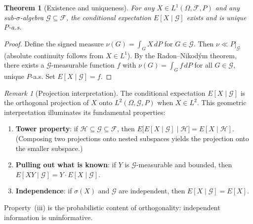 \documentclass[12pt]{amsart}
\newtheorem{theorem}{Theorem}[section]
\theoremstyle{definition}
\theoremstyle{remark}
\newtheorem*{remark}{Remark}
\newcommand{\cF}{\mathcal{F}}
\begin{document}
\begin{theorem}[Existence and uniqueness]\label{thm:cond-exp-exists}
For any $X \in L^1(\Omega, \cF, P)$ and any sub-$\sigma$-algebra $\mathcal{G} \subseteq \cF$, the conditional expectation $E[X \mid \mathcal{G}]$ exists and is unique $P$-a.s.
\end{theorem}

\begin{proof}
Define the signed measure $\nu(G) = \int_G X\, dP$ for $G \in \mathcal{G}$. Then $\nu \ll P|_\mathcal{G}$ (absolute continuity follows from $X \in L^1$). By the Radon--Nikod\'ym theorem, there exists a $\mathcal{G}$-measurable function $f$ with $\nu(G) = \int_G f\, dP$ for all $G \in \mathcal{G}$, unique $P$-a.s. Set $E[X \mid \mathcal{G}] = f$.
\end{proof}

\begin{remark}[Projection interpretation]
The conditional expectation $E[X \mid \mathcal{G}]$ is the orthogonal projection of $X$ onto $L^2(\Omega, \mathcal{G}, P)$ when $X \in L^2$. This geometric interpretation illuminates its fundamental properties:
\begin{enumerate}[label=(\roman*)]
\item \textbf{Tower property}: if $\mathcal{H} \subseteq \mathcal{G} \subseteq \cF$, then $E\bigl[E[X \mid \mathcal{G}] \mid \mathcal{H}\bigr] = E[X \mid \mathcal{H}]$. (Composing two projections onto nested subspaces yields the projection onto the smaller subspace.)
\item \textbf{Pulling out what is known}: if $Y$ is $\mathcal{G}$-measurable and bounded, then $E[XY \mid \mathcal{G}] = Y \cdot E[X \mid \mathcal{G}]$.
\item \textbf{Independence}: if $\sigma(X)$ and $\mathcal{G}$ are independent, then $E[X \mid \mathcal{G}] = E[X]$.
\end{enumerate}
Property~(iii) is the probabilistic content of orthogonality: independent information is uninformative.
\end{remark}
\end{document}
